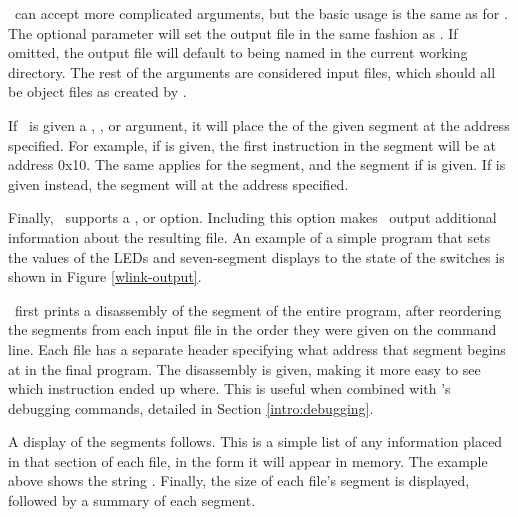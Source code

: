 \wlink\ can accept more complicated arguments, but the basic usage is
the same as for \wasm. The optional  parameter will set
the output file in the same fashion as \wasm. If omitted, the output file
will default to being named  in the current working
directory. The rest of the arguments are considered input files, which should
all be object files as created by \wasm.

If \wlink\ is given a , , or  argument, 
it will place the  of the given segment at the address specified. For
example, if  is given, the first instruction in the
 segment will be at address 0x10. The same applies for the
 segment, and the  segment if  is given. If
 is given instead, the  segment will  at the
address specified.

Finally, \wlink\ supports a , or  option. Including this
option makes \wlink\ output additional information about the resulting
 file. An example of a simple program that sets the values
of the LEDs and seven-segment displays to the state of the switches is shown
in Figure \ref{wlink-output}.

\wlink\ first prints a disassembly of the  segment of the entire
program, after reordering the  segments from each input file in the
order they were given on the command line. Each file has a separate header
specifying what address that segment begins at in the final program. The
disassembly is given, making it more easy to see which instruction ended up
where. This is useful when combined with \WRAMPmon's debugging commands,
detailed in Section \ref{intro:debugging}.

A display of the  segments follows. This is a simple list of any
information placed in that section of each file, in the form it will appear
in memory. The example above shows the string . Finally, the
size of each file's  segment is displayed, followed by a summary
of each segment.

